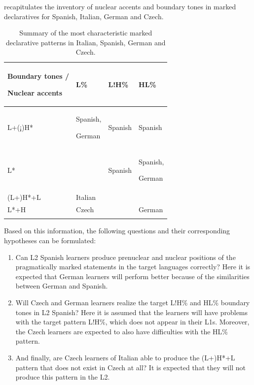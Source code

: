  recapitulates the inventory of nuclear accents and boundary tones in marked declaratives for Spanish, Italian, German and Czech.

\begin{table}
\begin{tabularx}{\textwidth}{Qlll}

\lsptoprule

{Boundary tones /}

{Nuclear accents} & {L\%} & {L!H\%} & {HL\%}\\
\midrule
{L+(¡)H*} & Spanish,

German & Spanish & Spanish\\
{L*} &  & Spanish & Spanish,

German\\
{(L+)H*+L} & Italian &  & \\
{L*+H} & Czech &  & German\\
\lspbottomrule
\end{tabularx}

\caption{Summary of the most characteristic marked declarative patterns in Italian, Spanish, German and Czech.}
\label{tab:4.10}
\end{table}

Based on this information, the following questions and their corresponding hypotheses can be formulated:

\begin{enumerate}[label=H\arabic*,font=\PeskovaColonAfterItem]
\item\label{nonneutral-h1}
 Can L2 Spanish learners produce prenuclear and nuclear positions of the pragmatically marked statements in the target languages correctly? Here it is expected that German learners will perform better because of the similarities between German and Spanish.

\item\label{nonneutral-h2}
 Will Czech and German learners realize the target L!H\% and HL\% boundary tones in L2 Spanish? Here it is assumed that the learners will have problems with the target pattern L!H\%, which does not appear in their L1s. Moreover, the Czech learners are expected to also have difficulties with the HL\% pattern.

\item\label{nonneutral-h3}
 And finally, are Czech learners of Italian able to produce the (L+)H*+L pattern that does not exist in Czech at all? It is expected that they will not produce this pattern in the L2.
\end{enumerate}

